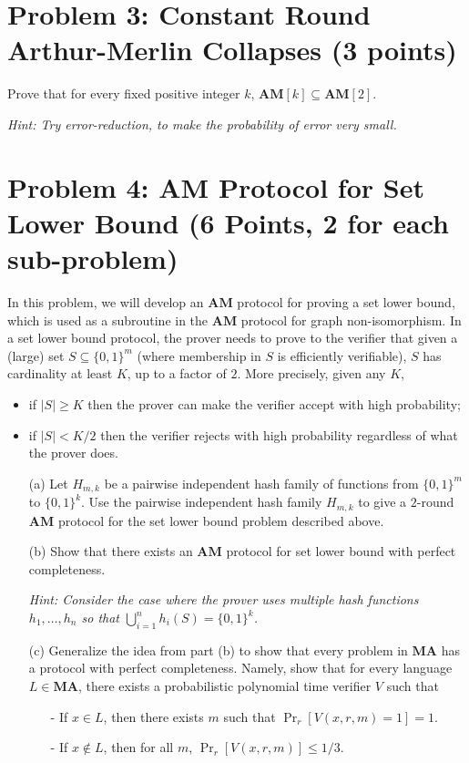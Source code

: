 \documentclass{article}
\newcommand{\AM}{\mathbf{AM}}
\newcommand{\MA}{\mathbf{MA}}
\begin{document}
\newpage
\section*{Problem 3: Constant Round Arthur-Merlin Collapses (3 points)}

Prove that for every fixed positive integer $k$, $\AM[k]\subseteq \AM[2]$.

\medskip

\emph{Hint: Try error-reduction, to make the probability of error very small.}


\section*{Problem 4: AM Protocol for Set Lower Bound (6 Points, 2 for each sub-problem)}

In this problem, we will develop an $\AM$ protocol for proving a set lower bound, which is used as a subroutine in the $\AM$ protocol for graph non-isomorphism. In a set lower bound protocol, the prover needs to prove to the verifier that given a (large) set $S\subseteq \{0,1\}^m$ (where membership in $S$ is efficiently verifiable), $S$ has cardinality at least $K$, up to a factor of $2$. More precisely, given any $K$,
\begin{itemize}
\item  if $|S| \ge K$ then the prover can make the verifier accept with high probability; 
\item if $|S| < K/2$ then the verifier rejects with high probability regardless of what the prover does.
\end{itemize}


\begin{enumerate}
    \item[(a)] Let $H_{m,k}$ be a pairwise independent hash family of functions from $\{0,1\}^m$ to $\{0,1\}^k$. Use the pairwise independent hash family $H_{m,k}$ to give a $2$-round $\AM$ protocol for the set lower bound problem described above.
    
    \item[(b)] Show that there exists an $\AM$ protocol for set lower bound with perfect completeness.

    \emph{Hint: Consider the case where the prover uses multiple hash functions $h_1,\dots, h_n$ so that $\bigcup_{i = 1}^n h_i(S) = \{0,1\}^k$.}
    
    \item[(c)] Generalize the idea from part (b) to show that every problem in $\MA$ has a protocol with perfect completeness. Namely, show that for every language $L\in \MA$, there exists a probabilistic polynomial time verifier $V$ such that 
    \begin{enumerate}
        \item[-] If $x\in L$, then there exists $m$ such that $\Pr_r[V(x,r,m) = 1] = 1$.
        \item[-] If $x\not\in L$, then for all $m$, $\Pr_r[V(x,r,m)]\le 1/3$.
    \end{enumerate}
\end{enumerate}
\end{document}
